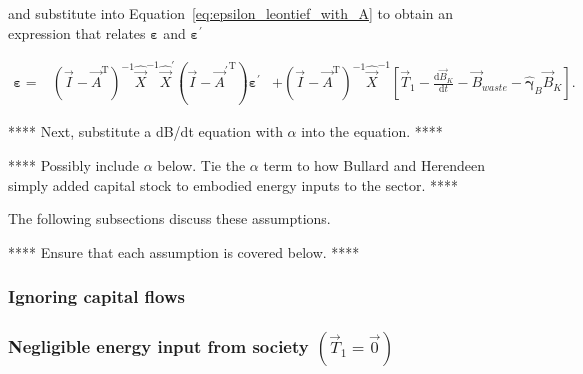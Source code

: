 \noindent{}and substitute into
Equation~\ref{eq:epsilon_leontief_with_A}
to obtain an expression that relates $\boldsymbol{\varepsilon}$ 
and $\boldsymbol{\varepsilon}^{'}$

\begin{align}
	\boldsymbol{\varepsilon}
	=& {\left( \vec{I} - \vec{A}^{\mathrm{T}} \right)}^{-1} \hat{\vec{X}}^{-1}
			\hat{\vec{X}}^{'} \left( \vec{I} - {\vec{A}^{'}}^{\mathrm{T}} \right) 
			\boldsymbol{\varepsilon^{'}} 
	& + {\left( \vec{I} - \vec{A}^{\mathrm{T}} \right)}^{-1} \hat{\vec{X}}^{\mathrm{-1}}
	\left[ \vec{T}_{1} - \frac{\mathrm{d}\vec{B}_{K}}{\mathrm{d}t}  
			- \vec{B}_{waste} - \hat{\boldsymbol{\gamma}}_{B} \vec{B}_{K} \right].
\end{align}

**** Next, substitute a dB/dt equation with $\alpha$ into the equation. ****

**** Possibly include $\alpha$ below. 
Tie the $\alpha$ term to how Bullard and Herendeen 
simply added capital stock to embodied energy inputs to the sector. ****

The following subsections discuss these assumptions.

**** Ensure that each assumption is covered below. ****



\subsubsection{Ignoring capital flows}



\subsubsection{Negligible energy input from society $\left( \vec{T}_{1} = \vec{0} \right)$}

